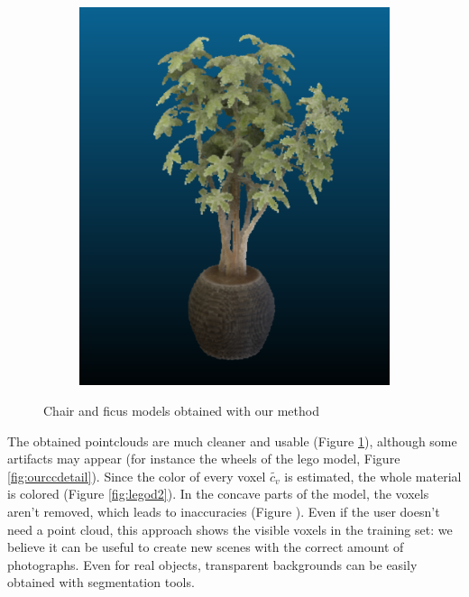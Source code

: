 \documentclass{article}
\begin{document}
\begin{figure}[!h]
\begin{subfigure}{.24\textwidth}
  \includegraphics[width=\linewidth]{figs/carve/ficusc.png}  
\end{subfigure}
     \caption{Chair and ficus models obtained with our method}
    \label{fig:cc2}
\end{figure}

The obtained pointclouds are much cleaner and usable (Figure \ref{fig:cc2}), although some artifacts may appear (for instance the wheels of the lego model, Figure \ref{fig:ourccdetail}). Since the color of every voxel $\tilde{c_v}$ is estimated, the whole material is colored (Figure \ref{fig:legod2}). In the concave parts of the model, the voxels aren't removed, which leads to inaccuracies (Figure \label{fig:legod3}). Even if the user doesn't need a point cloud, this approach shows the visible voxels in the training set: we believe it can be useful to create new scenes with the correct amount of photographs. Even for real objects, transparent backgrounds can be easily obtained with segmentation tools. 
\end{document}
